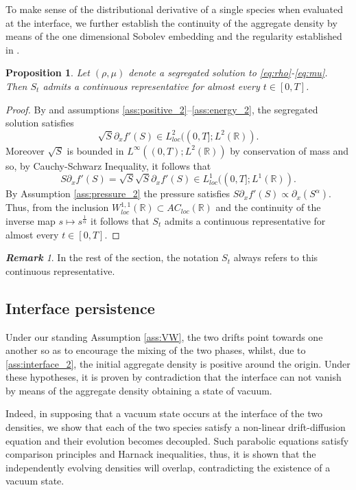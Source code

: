 \documentclass[a4paper,twosided, 11pt]{article}
\newcommand{\R}{\mathbb{R}}
\theoremstyle{plain}
\newtheorem{proposition}[thm]{Proposition}
\theoremstyle{remark}
\newtheorem{remark}[thm]{\bf Remark}
\numberwithin{equation}{section}
\begin{document}
To make sense of the distributional derivative of a single species when evaluated at the interface, we further establish the continuity of the aggregate density by means of the one dimensional Sobolev embedding and the regularity established in \cite{santambrogioschulz2026segregated}.
\begin{proposition}\label{propn:sumcontinuity}
     Let $(\rho,\mu)$ denote a segregated solution to \eqref{eq:rho}-\eqref{eq:mu}.
     Then $S_t$ admits a continuous representative for almost every $t \in [0,T]$.
\end{proposition}
\begin{proof}
    By \cite[Theorem 3.5]{santambrogioschulz2026segregated} and assumptions \ref{ass:positive_2}--\ref{ass:energy_2}, the segregated solution satisfies 
    \[\sqrt{S} \partial_x f'(S) \in L^2_{loc}((0,T];L^2(\R)).
    \]Moreover $\sqrt{S}$ is bounded in $L^\infty((0,T);L^2(\R))$ by conservation of mass and so, by Cauchy-Schwarz Inequality, it follows that 
    \[S \partial_x f'(S)=\sqrt{S}\sqrt{S}\partial_x f'(S) \in  L^1_{loc}((0,T];L^1(\R)).
    \]
    By Assumption \ref{ass:pressure_2} the pressure satisfies $S \partial_x f'(S) \propto \partial_x(S^ \alpha)$. 
    Thus, from the inclusion $W^{1,1}_{loc}(\R) \subset AC_{loc}(\R)$ and the continuity of the inverse map $s \mapsto s^\frac{1}{\alpha}$ it follows that $S_t$ admits a continuous representative for almost every $t \in [0,T]$.
\end{proof}

\begin{remark}
In the rest of the section, the notation $S_t$ always refers to this continuous representative. 
\end{remark}



\subsection{Interface persistence}
Under our standing Assumption \ref{ass:VW}, the two drifts point towards one another so as to encourage the mixing of the two phases, whilst, due to \ref{ass:interface_2}, the initial aggregate density is positive around the origin. 
Under these hypotheses, it is proven by contradiction that the interface can not vanish by means of the aggregate density obtaining a state of vacuum. 

\medskip 

Indeed, in supposing that a vacuum state occurs at the interface of the two densities, we show that each of the two species satisfy a non-linear drift-diffusion equation and their evolution becomes decoupled. 
Such parabolic equations satisfy comparison principles and Harnack inequalities, thus, it is shown that the independently evolving densities will overlap, contradicting the existence of a vacuum state. 
\end{document}
